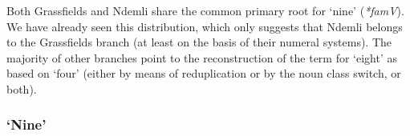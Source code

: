 Both Grassfields and Ndemli share the common primary root for `nine' (\textit{*famV}). We have already seen this distribution, which only suggests that Ndemli belongs to the Grassfields branch (at least on the basis of their numeral systems). The majority of other branches point to the reconstruction of the term for `eight' as based on `four' (either by means of reduplication or by the noun class switch, or both).

\clearpage
\subsubsection{  `Nine'} 
\begin{table}
\caption{\label{tab:3:10}Bantoid stems and patterns for `9'}

\end{table}
